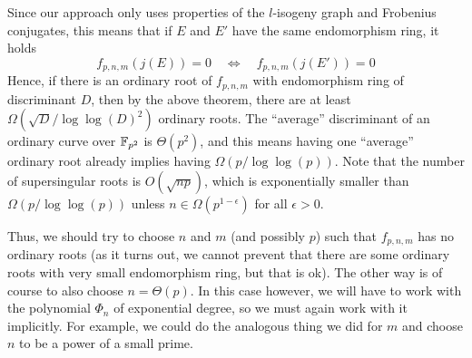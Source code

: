 Since our approach only uses properties of the $l$-isogeny graph and Frobenius conjugates, this means that if $E$ and $E'$ have the same endomorphism ring, it holds
\begin{equation*}
    f_{p, n, m}(j(E)) = 0 \quad \Leftrightarrow \quad f_{p, n, m}(j(E')) = 0
\end{equation*}
Hence, if there is an ordinary root of $f_{p, n, m}$ with endomorphism ring of discriminant $D$, then by the above theorem, there are at least $\Omega(\sqrt{D}/\log\log(D)^2)$ ordinary roots.
The ``average'' discriminant of an ordinary curve over $\mathbb{F}_{p^2}$ is $\Theta(p^2)$, and this means having one ``average'' ordinary root already implies having $\Omega(p / \log\log(p))$.
Note that the number of supersingular roots is $O(\sqrt{np})$, which is exponentially smaller than $\Omega(p/\log\log(p))$ unless $n \in \Omega(p^{1 - \epsilon})$ for all $\epsilon > 0$.

Thus, we should try to choose $n$ and $m$ (and possibly $p$) such that $f_{p, n, m}$ has no ordinary roots
(as it turns out, we cannot prevent that there are some ordinary roots with very small endomorphism ring, but that is ok).
The other way is of course to also choose $n = \Theta(p)$.
In this case however, we will have to work with the polynomial $\Phi_n$ of exponential degree, so we must again work with it implicitly.
For example, we could do the analogous thing we did for $m$ and choose $n$ to be a power of a small prime.

